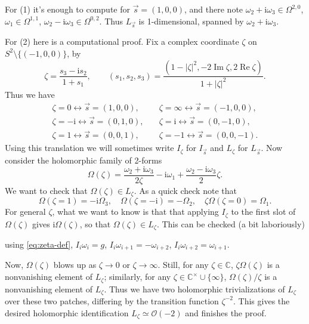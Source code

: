 \documentclass[12pt,letterpaper,reqno]{article}
\numberwithin{equation}{section}
\newcommand{\cO}{\ensuremath{\mathcal O}}
\newcommand{\C}{\ensuremath{\mathbb C}}
\newcommand{\I}{{\mathrm i}}
\newcommand{\abs}[1]{\lvert#1\rvert}
\newcommand{\mmaref}[1]{}
\DeclareMathOperator{\im}{Im}
\DeclareMathOperator{\re}{Re}
\begin{document}
\begin{pf}
For (1) it's enough to compute for $\vec{s} = (1,0,0)$, and there note
$\omega_2 + \I \omega_3 \in \Omega^{2,0}$, $\omega_1 \in \Omega^{1,1}$,
$\omega_2 - \I \omega_3 \in \Omega^{0,2}$. Thus $L_{\vec s}$ is 1-dimensional,
spanned by $\omega_2 + \I \omega_3$.

For (2) here is a computational proof.
Fix a complex coordinate $\zeta$
on $S^2 \setminus \{ (-1,0,0) \}$, by
\begin{equation} \label{eq:zeta-def}
 \zeta = \frac{s_3 - \I s_2}{1 + s_1}, \qquad (s_1, s_2, s_3) = \frac{(1 - \abs{\zeta}^2, -2 \im \zeta, 2 \re \zeta)}{1+\abs{\zeta}^2}.
\end{equation}
Thus we have
\begin{align}
  \zeta = 0 \leftrightarrow \vec s = (1,0,0), \quad & \zeta = \infty \leftrightarrow \vec s = (-1,0,0), \\
  \zeta = -\I \leftrightarrow \vec s = (0,1,0), \quad & \zeta = \I \leftrightarrow \vec s = (0,-1,0), \\
  \zeta = 1 \leftrightarrow \vec s = (0,0,1), \quad & \zeta = -1 \leftrightarrow \vec s = (0,0,-1).
\end{align}
Using this translation we will sometimes write 
$I_\zeta$ for $I_{\vec s}$ and $L_\zeta$ for $L_{\vec s}$.
Now consider the holomorphic family of 2-forms
\begin{equation} \label{eq:hol-symp-family}
  \Omega(\zeta) = \frac{\omega_2 + \I \omega_3}{2\zeta} - \I\omega_1 + \frac{\omega_2 - \I \omega_3}{2} \zeta.
\end{equation}
We want to check that $\Omega(\zeta) \in L_\zeta$.
As a quick check note that
\begin{equation}
  \Omega(\zeta=1) = -\I \Omega_3, \quad \Omega(\zeta=-\I) = - \Omega_2, \quad \zeta \Omega(\zeta=0) = \Omega_1.
\end{equation}
For general $\zeta$, what we want to know is that
that applying $I_\zeta$ to the first slot of $\Omega(\zeta)$ gives
$\I \Omega(\zeta)$, so that $\Omega(\zeta) \in L_\zeta$.
This can be checked (a bit laboriously) 
\mmaref{verify-holsymp}
using \eqref{eq:zeta-def}, $I_i \omega_i = g$,
$I_i \omega_{i+1} = -\omega_{i+2}$, $I_i \omega_{i+2} = \omega_{i+1}$.

Now, $\Omega(\zeta)$ blows up as $\zeta \to 0$ or 
$\zeta \to \infty.$
Still, for any $\zeta \in \C$, $\zeta \Omega(\zeta)$ is
a nonvanishing element of $L_\zeta$;
similarly, for any $\zeta \in \C^\times \cup \{\infty\}$,
$\Omega(\zeta) / \zeta$ is a nonvanishing element of $L_\zeta$.
Thus we have two holomorphic trivializations of $L_\zeta$ over 
these two patches, differing by the transition function $\zeta^{-2}$.
This gives the desired holomorphic identification
$L_\zeta \simeq \cO(-2)$ and finishes the proof.
\end{pf}
\end{document}
